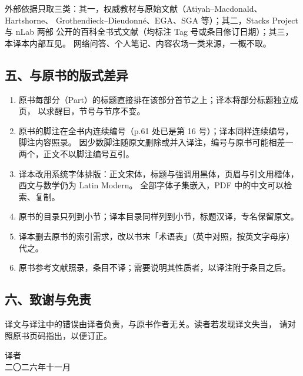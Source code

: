 外部依据只取三类：其一，权威教材与原始文献（Atiyah--Macdonald、Hartshorne、
Grothendieck--Dieudonné、EGA、SGA 等）；其二，Stacks Project 与 nLab 两部
公开的百科全书式文献（均标注 Tag 号或条目修订日期）；其三，本译本内部互见。
网络问答、个人笔记、内容农场一类来源，一概不取。

\subsection*{五、与原书的版式差异}

\begin{enumerate}
\item 原书每部分（Part）的标题直接排在该部分首节之上；译本将部分标题独立成页，
      以求醒目，节号与节序不变。
\item 原书的脚注在全书内连续编号（p.61 处已是第 16 号）；译本同样连续编号，脚注内容照录。
      因少数脚注随原文删除或并入译注，编号与原书可能相差一两个，正文不以脚注编号互引。
\item 译本改用系统字体排版：正文宋体，标题与强调用黑体，页眉与引文用楷体，西文与数学仍为 Latin Modern。
      全部字体子集嵌入，PDF 中的中文可以检索、复制。
\item 原书的目录只列到小节；译本目录同样列到小节，标题汉译，专名保留原文。
\item 译本删去原书的索引需求，改以书末「术语表」（英中对照，按英文字母序）代之。
\item 原书参考文献照录，条目不译；需要说明其性质者，以译注附于条目之后。
\end{enumerate}

\subsection*{六、致谢与免责}

译文与译注中的错误由译者负责，与原书作者无关。读者若发现译文失当，
请对照原书页码指出，以便订正。

\vspace{1.2em}
\noindent\hfill\begin{minipage}{0.42\linewidth}
\raggedleft\kaishu 译者\\[0.3em]
二〇二六年十一月
\end{minipage}

\clearpage

